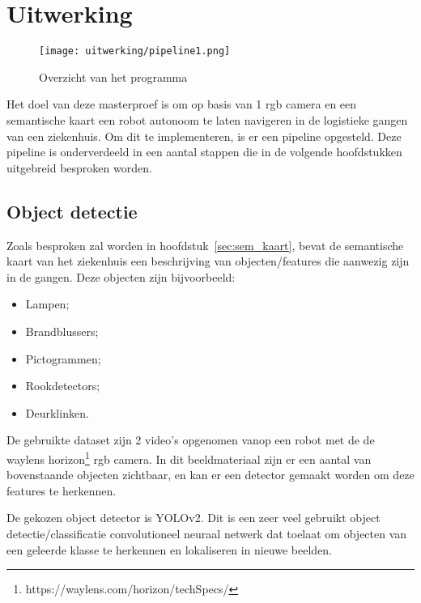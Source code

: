 
\chapter{Uitwerking}

\begin{figure}[!h]
    \centering
    \texttt{[image: uitwerking/pipeline1.png]}
    \caption{Overzicht van het programma}
    \label{fig:pipeline1}
\end{figure}

Het doel van deze masterproef is om op basis van 1 \gls{rgb} camera en een semantische kaart een robot autonoom te laten navigeren in de logistieke gangen van een ziekenhuis.
Om dit te implementeren, is er een pipeline opgesteld. Deze pipeline is onderverdeeld in een aantal stappen die in de volgende hoofdstukken uitgebreid besproken worden.

\section{Object detectie}

Zoals besproken zal worden in hoofdstuk~\ref{sec:sem_kaart}, bevat de semantische kaart van het ziekenhuis een beschrijving van objecten/features die aanwezig zijn in de gangen.
Deze objecten zijn bijvoorbeeld:
\begin{itemize}
    \item Lampen;
    \item Brandblussers;
    \item Pictogrammen;
    \item Rookdetectors;
    \item Deurklinken.
\end{itemize}

De gebruikte dataset zijn 2 video's opgenomen vanop een robot met de de waylens horizon\footnote{https://waylens.com/horizon/techSpecs/} \gls{rgb} camera.
In dit beeldmateriaal zijn er een aantal van bovenstaande objecten zichtbaar, en kan er een detector gemaakt worden om deze features te herkennen.

De gekozen object detector is YOLOv2\cite{yolov22016}. Dit is een zeer veel gebruikt object detectie/classificatie convolutioneel neuraal netwerk dat toelaat om
objecten van een geleerde klasse te herkennen en lokaliseren in nieuwe beelden.

